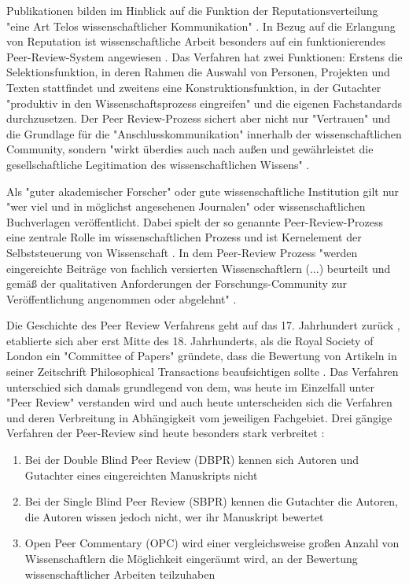 Publikationen bilden im Hinblick auf die Funktion der Reputationsverteilung "eine Art Telos wissenschaftlicher Kommunikation" \cite{hirschauer2004peer}. In Bezug auf die Erlangung von Reputation ist wissenschaftliche Arbeit besonders auf ein funktionierendes Peer-Review-System angewiesen \cite{Luescher_2014}. Das Verfahren hat zwei Funktionen: Erstens die Selektionsfunktion, in deren Rahmen die Auswahl von Personen, Projekten und Texten stattfindet und zweitens eine Konstruktionsfunktion, in der Gutachter "produktiv in den Wissenschaftsprozess eingreifen" \cite{Neidhardt_2010} und die eigenen Fachstandards durchzusetzen. Der Peer Review-Prozess sichert aber nicht nur "Vertrauen" und die Grundlage für die "Anschlusskommunikation" innerhalb der wissenschaftlichen Community, sondern "wirkt überdies auch nach außen und gewährleistet die gesellschaftliche Legitimation des wissenschaftlichen Wissens" \cite{pscheida_2010_wikipedia}.

Als "guter akademischer Forscher" oder gute wissenschaftliche Institution gilt nur "wer viel und in möglichst angesehenen Journalen" \cite{Frey_2005} oder wissenschaftlichen Buchverlagen veröffentlicht. Dabei spielt der so genannte Peer-Review-Prozess eine zentrale Rolle im wissenschaftlichen Prozess \cite{smith_1999_opening} und ist Kernelement der Selbststeuerung von Wissenschaft \cite{Neidhardt_2010}. In dem Peer-Review Prozess "werden eingereichte Beiträge von fachlich versierten Wissenschaftlern (...) beurteilt und gemäß der qualitativen Anforderungen der Forschungs-Community zur Veröffentlichung angenommen oder abgelehnt" \cite{Hess_2006}.

Die Geschichte des Peer Review Verfahrens geht auf das 17. Jahrhundert zurück \cite{Kronick_1978}, etablierte sich aber erst Mitte des 18. Jahrhunderts, als die Royal Society of London ein "Committee of Papers" gründete, dass die Bewertung von Artikeln in seiner Zeitschrift Philosophical Transactions beaufsichtigen sollte \cite{Kronick_1990}. Das Verfahren unterschied sich damals grundlegend von dem, was heute im Einzelfall unter "Peer Review" verstanden wird und auch heute unterscheiden sich die Verfahren und deren Verbreitung in Abhängigkeit vom jeweiligen Fachgebiet. Drei gängige Verfahren der Peer-Review sind heute besonders stark verbreitet \cite{mueller_2009_peerreview}:
\begin{enumerate}
\item Bei der Double Blind Peer Review (DBPR) kennen sich Autoren und Gutachter eines eingereichten Manuskripts nicht
\item Bei der Single Blind Peer Review (SBPR) kennen die Gutachter die Autoren, die Autoren wissen jedoch nicht, wer ihr Manuskript bewertet
\item Open Peer Commentary (OPC) wird einer vergleichsweise großen Anzahl von Wissenschaftlern die Möglichkeit eingeräumt wird, an der Bewertung wissenschaftlicher Arbeiten teilzuhaben
\end{enumerate}

